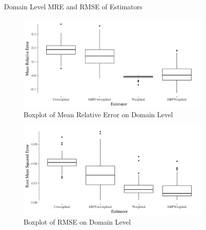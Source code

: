 \documentclass[fleqn,final]{beamer}
\newcommand{\Pheight}{\rule[-5mm]{0cm}{1cm}}
\begin{document}
\begin{frame}
\begin{columns}[t]
\begin{column}{.3\linewidth}

\begin{block}{Domain Level MRE and RMSE of Estimators \Pheight}
\begin{center}
	\begin{figure}
		\includegraphics[width=0.9\textwidth]{BoxPlotMREByDomain}
		\caption{Boxplot of Mean Relative Error on Domain Level}
	\end{figure}
		\begin{figure}
		\includegraphics[width=0.9\textwidth]{BoxPlotRMSEByDomain}
		\caption{Boxplot of RMSE on Domain Level}
	\end{figure}
\end{center}
\end{block}

\end{column}

%

\begin{column}{.3\linewidth}



\end{column}
\end{columns}
\end{frame}
\end{document}
